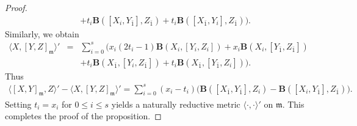 \documentclass[10pt,a4paper]{amsart}
\begin{document}
\begin{proof}
\begin{eqnarray*}
                                       &&+t_{i}\mathbf{B}([X_{i},Y_{\bar{1}}],Z_{\bar{1}})+t_{i}\mathbf{B}([X_{\bar{1}},Y_{i}],Z_{\bar{1}})
                                            \Big).
\end{eqnarray*}
Similarly, we obtain
\begin{eqnarray*}
\langle X, [Y,Z]_{\mathfrak{m}}\rangle'&=&\sum_{i=0}^{s}\Big(
                                          x_{i}(2t_{i}-1)\mathbf{B}(X_{i},[Y_{i},Z_{i}])+x_{i}\mathbf{B}(X_{i},[Y_{\bar{1}},Z_{\bar{1}}])\\
                                       && +t_{i}\mathbf{B}(X_{\bar{1}},[Y_{i},Z_{\bar{1}}])+t_{i}\mathbf{B}(X_{\bar{1}},[Y_{\bar{1}},Z_{i}])
                                          \Big).
\end{eqnarray*}
Thus
\begin{eqnarray*}
\langle [X,Y]_{\mathfrak{m}},Z\rangle'-\langle X, [Y,Z]_{\mathfrak{m}}\rangle'=
\sum_{i=0}^{s}(x_{i}-t_{i})\Big(
                                    \mathbf{B}([X_{\bar{1}},Y_{\bar{1}}],Z_{i})- \mathbf{B}([X_{i},Y_{\bar{1}}],Z_{\bar{1}})
                               \Big).
\end{eqnarray*}
Setting $t_{i}=x_{i}$ for $0\leq i\leq s$ yields a naturally reductive metric $\langle\cdot,\cdot\rangle'$ on $\mathfrak{m}$. This completes the proof of the proposition.
 \end{proof}
\end{document}
